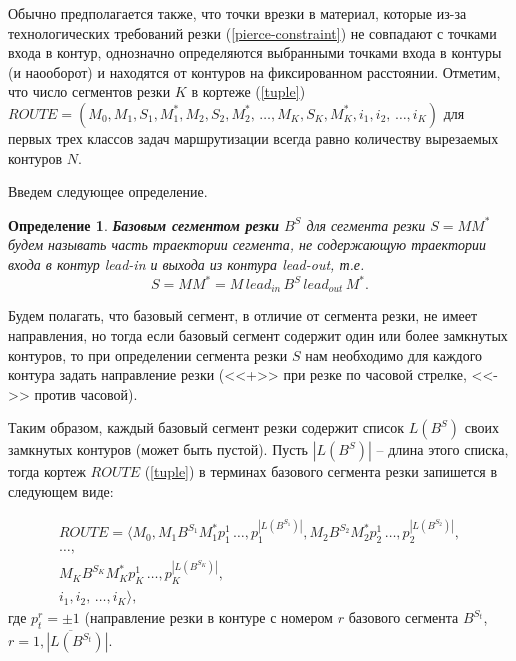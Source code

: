 \documentclass[11pt,twoside,openany]{report}
\newcounter{theo}
\newcounter{pred}
\newcounter{opred}
\newtheorem{opred}{Определение}[section]
\begin{document}
Обычно предполагается также,
что точки врезки в материал,
которые из-за технологических требований резки
(\ref{pierce-constraint})
не совпадают с точками входа в контур,
однозначно определяются выбранными точками входа в контуры (и наооборот)
и находятся от контуров на фиксированном расстоянии.
Отметим, что число сегментов резки
$K$ в кортеже (\ref{tuple})
$ROUTE = (
  M_0, M_1, S_1, M_1^*, M_2, S_2, M_2^*, \,\dots, M_K, S_K, M_K^*,
  i_1, i_2, \,\dots, i_K
)$
для первых трех классов задач маршрутизации всегда равно количеству вырезаемых контуров
$N$.

Введем следующее определение.

\begin{opred}
  \label{def:base-segment}
  {\bf Базовым сегментом резки}
  $B^S$
  для сегмента резки
  $S=MM^*$
  будем называть часть траектории сегмента,
  не содержающую траектории входа в контур
  {\it lead-in} и выхода из контура {\it lead-out},
  т.е.
  \begin{equation}
    S=MM^* = M \, lead_{in} \, B^S \, lead_{out} \, M^*
    .
    \label{base-segment}
  \end{equation}
\end{opred}

Будем полагать,
что базовый сегмент,
в отличие от сегмента резки,
не имеет направления,
но тогда если базовый сегмент содержит
один или более замкнутых контуров,
то при определении сегмента резки $S$
нам необходимо для каждого контура задать направление резки
(<<+>> при резке по часовой стрелке,
<<->> против часовой).

Таким образом,
каждый базовый сегмент резки
содержит список
$L(B^S)$
своих замкнутых контуров (может быть пустой).
Пусть
$|L(B^S)|$ --
длина этого списка, тогда кортеж $ROUTE$ (\ref{tuple})
в терминах базового сегмента резки запишется в следующем виде:

\begin{multline}
  ROUTE =  \langle
    M_0, M_1 B^{S_1} M_1^* p_1^1 \,\dots, p_1^{|L(B^{S_1})|},
    M_2 B^{S_2} M_2^* p_2^1 \,\dots, p_2^{|L(B^{S_2})|},
    \\ \dots, \\
    M_K B^{S_K} M_K^* p_K^1 \,\dots, p_K^{|L(B^{S_K})|},
    \\
    i_1, i_2, \,\dots, i_K
  \rangle
  ,
  \label{tuple-base-segments}
\end{multline}
где $p_t^r=\pm 1$
(направление резки в контуре с номером $r$ базового сегмента  $B^{S_t}$,
$r=\overline{1, |L(B^{S_t})|}$.
\end{document}
